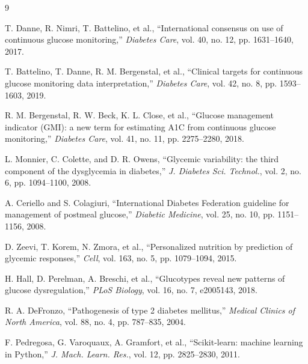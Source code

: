 \documentclass[10pt,conference,compsoc]{IEEEtran}
\begin{document}
\begin{thebibliography}{9}

T. Danne, R. Nimri, T. Battelino, et al., ``International consensus on use
of continuous glucose monitoring,'' \emph{Diabetes Care}, vol. 40, no. 12,
pp. 1631--1640, 2017.

T. Battelino, T. Danne, R. M. Bergenstal, et al., ``Clinical targets for
continuous glucose monitoring data interpretation,'' \emph{Diabetes Care},
vol. 42, no. 8, pp. 1593--1603, 2019.

R. M. Bergenstal, R. W. Beck, K. L. Close, et al., ``Glucose management
indicator (GMI): a new term for estimating A1C from continuous glucose
monitoring,'' \emph{Diabetes Care}, vol. 41, no. 11, pp. 2275--2280, 2018.

L. Monnier, C. Colette, and D. R. Owens, ``Glycemic variability: the third
component of the dysglycemia in diabetes,'' \emph{J. Diabetes Sci. Technol.},
vol. 2, no. 6, pp. 1094--1100, 2008.

A. Ceriello and S. Colagiuri, ``International Diabetes Federation guideline for
management of postmeal glucose,'' \emph{Diabetic Medicine}, vol. 25, no. 10,
pp. 1151--1156, 2008.

D. Zeevi, T. Korem, N. Zmora, et al., ``Personalized nutrition by
prediction of glycemic responses,'' \emph{Cell}, vol. 163, no. 5,
pp. 1079--1094, 2015.

H. Hall, D. Perelman, A. Breschi, et al., ``Glucotypes reveal new patterns
of glucose dysregulation,'' \emph{PLoS Biology}, vol. 16, no. 7, e2005143, 2018.

R. A. DeFronzo, ``Pathogenesis of type 2 diabetes mellitus,'' \emph{Medical
Clinics of North America}, vol. 88, no. 4, pp. 787--835, 2004.

F. Pedregosa, G. Varoquaux, A. Gramfort, et al., ``Scikit-learn: machine
learning in Python,'' \emph{J. Mach. Learn. Res.}, vol. 12, pp. 2825--2830, 2011.

\end{thebibliography}
\end{document}
